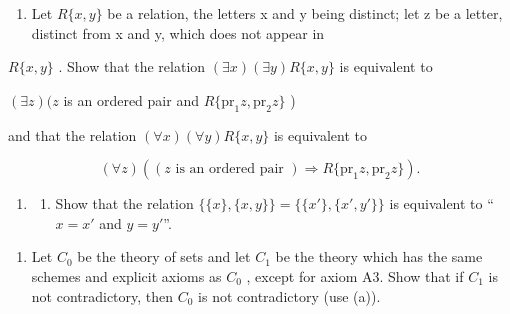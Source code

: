 \exercisegroup

\begin{enumerate}
\def\labelenumi{\arabic{enumi}.}
\tightlist
\item
  Let \(R\{x, y\}\) be a relation, the letters x and y being distinct; let z be a letter, distinct from x and y, which does not appear in
\end{enumerate}

\(R\{x, y\}\) . Show that the relation \((\exists x)(\exists y)R\{x, y\}\) is equivalent to

\((\exists z)(z\) is an ordered pair and \(R\{\mathrm{pr}_1z, \mathrm{pr}_2z\}\) )

and that the relation \((\forall x)(\forall y)R\{x, y\}\) is equivalent to

\[
(\forall z) ((z \text {   is   an   ordered   pair }) \Longrightarrow R \{\mathrm{pr} _ {1} z, \mathrm{pr} _ {2} z \}).
\]

\begin{enumerate}
\def\labelenumi{\arabic{enumi}.}
\setcounter{enumi}{1}
\tightlist
\item
  \begin{enumerate}
  \def\labelenumii{(\alph{enumii})}
  \tightlist
  \item
    Show that the relation \(\{\{x\}, \{x, y\}\} = \{\{x'\}, \{x', y'\}\}\) is equivalent to ``\(x = x'\) and \(y = y'\)''.
  \end{enumerate}
\end{enumerate}

\begin{enumerate}
\def\labelenumi{(\alph{enumi})}
\setcounter{enumi}{1}
\tightlist
\item
  Let \(C_{0}\) be the theory of sets and let \(C_{1}\) be the theory which has the same schemes and explicit axioms as \(C_{0}\) , except for axiom A3. Show that if \(C_{1}\) is not contradictory, then \(C_{0}\) is not contradictory (use (a)).
\end{enumerate}

